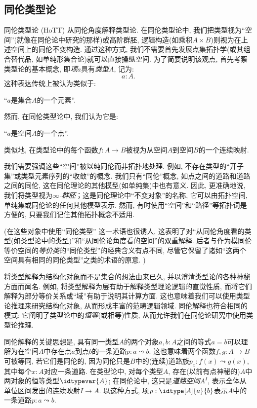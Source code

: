 \subsection*{同伦类型论}

同伦类型论 (HoTT) 从同伦角度解释类型论. 
在同伦类型论中, 我们把类型视为``空间''(就像在同伦论中研究的那样)或高阶群胚, 逻辑构造(如乘积$A\times B$)则视为在上述空间上的同伦不变构造. 
通过这种方式, 我们不需要首先发展点集拓扑学(或其组合替代品, 如单纯形集合论)就可以直接操纵空间. 
为了简要说明该观点, 首先考察类型论的基本概念, 即\emph{项}$a$具有\emph{类型}$A$, 记为: 
\[ a:A. \]
这种表达传统上被认为类似于: 
\begin{center}
``$a$是集合$A$的一个元素''. 
\end{center}
然而, 在同伦类型论中, 我们认为它是: 
\begin{center}
``$a$是空间$A$的一个点''. 
\end{center}
%
类似地, 在类型论中的每个函数$f : A\to B$被视为从空间$A$到空间$B$的一个连续映射. 

我们需要强调这些``空间''被以纯同伦而非拓扑地处理. 
例如, 不存在类型的``开子集''或类型元素序列的``收敛''的概念. 
我们只有``同伦''概念, 如点之间的道路和道路之间的同伦, 这在同伦理论的其他模型(如单纯集)中也有意义. 
因此, 更准确地说, 我们将类型视为\emph{$\infty$-群胚}；这是同伦理论中``不变对象''的名称, 它可以由拓扑空间, 
%
单纯集或同伦论的任何其他模型表示. 
然而, 有时使用``空间''和``路径''等拓扑词是方便的, 只要我们记住其他拓扑概念不适用. 

(在这些对象中使用``同伦类型''
%
这一术语也很诱人, 这表明了对``从同伦角度看的类型(如类型论中的类型)''和``从同伦论角度看的空间''的双重解释. 
后者与作为模同伦等价空间的\emph{等价类}的``同伦类型''的经典含义有点不同, 尽管它保留了诸如``这两个空间具有相同的同伦类型''之类的术语的原意. )

将类型解释为结构化对象而不是集合的想法由来已久, 并以澄清类型论的各种神秘方面而闻名. 
例如, 将类型解释为层有助于解释类型理论逻辑的直觉性质, 而将它们解释为部分等价关系或``域''有助于说明其计算方面. 
这也意味着我们可以使用类型论推理来研究结构化对象, 从而形成丰富的范畴逻辑领域. 
同伦解释也符合相同的模式: 它阐明了类型论中的\emph{恒等}(或相等)性质, 从而允许我们在同伦论研究中使用类型论推理. 

同伦解释的关键思想是, 具有同一类型$A$的两个对象$a, b: A$之间的等式$a = b$可以理解为在空间$A$中存在点$a$到点$b$的一条道路$p : a \leadsto b$.
这也意味着两个函数$f, g: A\to B$可被等同, 若它们是同伦的, 因为同伦只是$B$中的(连续)道路族$p_x: f(x) \leadsto g(x)$, 其中每个$x:A$对应一条道路. 
在类型论中, 对每个类型$A$, 存在(以前有点神秘的)$A$中两对象的恒等类型$\idtypevar{A}$; 在同伦论中, 这只是\emph{道路空间}$A^I$, 表示全体从单位区间发出的连续映射$I\to A$.
%
%
%
%
以这种方式, 项$p : \idtype[A]{a}{b}$表示$A$中的一条道路$p : a \leadsto b$. 


